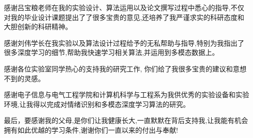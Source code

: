 \begin{thanks}

感谢吕宝粮老师在我的实验设计、算法运用以及论文撰写过程中悉心的指导,不仅对我的毕业设计课题提出了了很多宝贵的意见,还培养了我严谨求实的科研态度和大胆创新的科研精神。

感谢刘伟学长在我实验以及算法设计过程给予的无私帮助与指导,特别为我指出了很多深度学习的细节,帮助我快速学习相关算法,并运用到多模态数据上。

感谢各位实验室同学热心的支持我的研究工作, 你们给了我很多宝贵的建议和意想不到的灵感。

感谢电子信息与电气工程学院和计算机科学与工程系为我供优秀的实验设备和实验环境,让我得以完成对情绪识别和多模态深度学习算法的研究。

最后，要感谢我的父母,是你们让我健康长大,一直默默在背后支持我,让我能有机会拥有如此优越的学习条件,谢谢你们一直以来的付出与奉献!

\end{thanks}
